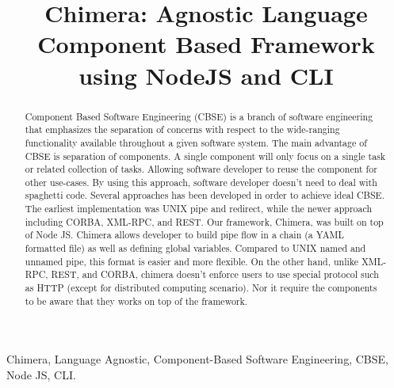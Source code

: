 \documentclass[conference]{IEEEtran}
\begin{document}
\title{Chimera: Agnostic Language Component Based Framework using NodeJS and CLI}

\author{
\and
{}
\and
{}
}

\maketitle


\begin{abstract}
Component Based Software Engineering (CBSE) is a branch of software 
engineering that emphasizes the separation of concerns with respect to the 
wide-ranging functionality available throughout a given software system.  The 
main advantage of CBSE is separation of components. A single component will 
only focus on a single task or related collection of tasks. Allowing software 
developer to reuse the component for other use-cases. By using this approach, 
software developer doesn't need to deal with spaghetti code. Several 
approaches has been developed in order to achieve ideal CBSE. The earliest 
implementation was UNIX pipe and redirect, while the newer approach including 
CORBA, XML-RPC, and REST. Our framework, Chimera, was built on top of Node JS. 
Chimera allows developer to build pipe flow in a chain (a YAML formatted file) 
as well as defining global variables. Compared to UNIX named and unnamed pipe, 
this format is easier and more flexible. On the other hand, unlike XML-RPC, 
REST, and CORBA, chimera doesn't enforce users to use special protocol such as 
HTTP (except for distributed computing scenario). Nor it require the components
to be aware that they works on top of the framework.
\end{abstract}

\begin{IEEEkeywords}
Chimera, Language Agnostic, Component-Based Software Engineering, CBSE, Node JS, CLI.
\end{IEEEkeywords}
\end{document}
